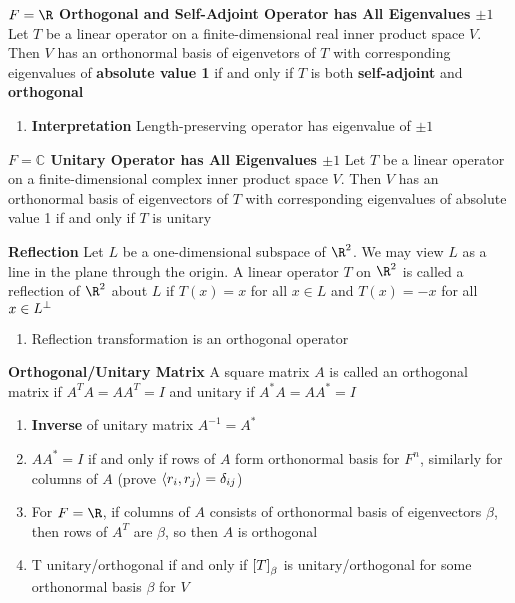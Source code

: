 \documentclass[11pt]{article}
\begin{document}
\begin{corollary*}
    \textbf{$F=\R$ Orthogonal and Self-Adjoint Operator has All Eigenvalues $\pm 1$} Let $T$ be a linear operator on a finite-dimensional real inner product space $V$. Then $V$ has an orthonormal basis of eigenvetors of $T$ with corresponding eigenvalues of \textbf{absolute value 1} if and only if $T$ is both \textbf{self-adjoint} and \textbf{orthogonal}
    \begin{enumerate}
        \item \textbf{Interpretation} Length-preserving operator has eigenvalue of $\pm 1$
    \end{enumerate}
\end{corollary*}

\begin{corollary*}
    \textbf{$F=\mathbb{C}$ Unitary Operator has All Eigenvalues $\pm 1$} Let $T$ be a linear operator on a finite-dimensional complex inner product space $V$. Then $V$ has an orthonormal basis of eigenvectors of $T$ with corresponding eigenvalues of absolute value 1 if and only if $T$ is unitary
\end{corollary*}

\begin{defn*}
    \textbf{Reflection} Let $L$ be a one-dimensional subspace of $\R^2$. We may view $L$ as a line in the plane through the origin. A linear operator $T$ on $\R^2$ is called a reflection of $\R^2$ about $L$ if $T(x) = x$ for all $x\in L$ and $T(x) = -x$ for all $x\in L^{\perp}$
    \begin{enumerate}
        \item Reflection transformation is an orthogonal operator
    \end{enumerate}
\end{defn*}

\begin{defn*}
    \textbf{Orthogonal/Unitary Matrix} A square matrix $A$ is called an orthogonal matrix if $A^T A = AA^T = I$ and unitary if $A^* A = AA^* = I$
    \begin{enumerate}
        \item \textbf{Inverse} of unitary matrix $A^{-1} = A^*$
        \item $AA^* = I$ if and only if rows of $A$ form orthonormal basis for $F^n$, similarly for columns of $A$ (prove $\langle r_i,r_j\rangle = \delta_{ij}$)
        \item For $F=\R$, if columns of $A$ consists of orthonormal basis of eigenvectors $\beta$, then rows of $A^T$ are $\beta$, so then $A$ is orthogonal
        \item T unitary/orthogonal if and only if $\left[ T \right]_{\beta}$ is unitary/orthogonal for some orthonormal basis $\beta$ for $V$
    \end{enumerate}
\end{defn*}
\end{document}
